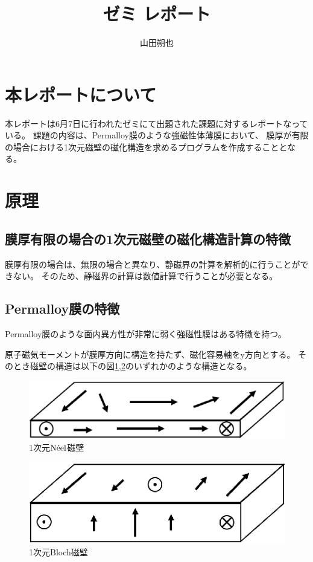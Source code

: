 \documentclass{jsarticle}
\begin{document}
\title{ゼミ レポート}
\author{山田朔也}
\maketitle

\section{本レポートについて}
本レポートは6月7日に行われたゼミにて出題された課題に対するレポートなっている。
課題の内容は、Permalloy膜のような強磁性体薄膜において、
膜厚が有限の場合における1次元磁壁の磁化構造を求めるプログラムを作成することとなる。

\section{原理}
\subsection{膜厚有限の場合の1次元磁壁の磁化構造計算の特徴}
膜厚有限の場合は、無限の場合と異なり、静磁界の計算を解析的に行うことができない。
そのため、静磁界の計算は数値計算で行うことが必要となる。

\subsection{Permalloy膜の特徴}
Permalloy膜のような面内異方性が非常に弱く強磁性膜はある特徴を持つ。

原子磁気モーメントが膜厚方向に構造を持たず、磁化容易軸をy方向とする。
そのとき磁壁の構造は以下の図\ref{fig01},\ref{fig02}のいずれかのような構造となる。
\begin{figure}[H]
	\centering
	\includegraphics[width=14cm]{pic01.eps}
	\caption{1次元$\mathrm{N\Acute{e}el}$磁壁}
	\label{fig01}
\end{figure}
\begin{figure}[H]
	\centering
	\includegraphics[width=14cm]{pic02.eps}
	\caption{1次元Bloch磁壁}
	\label{fig02}
\end{figure}
\end{document}
